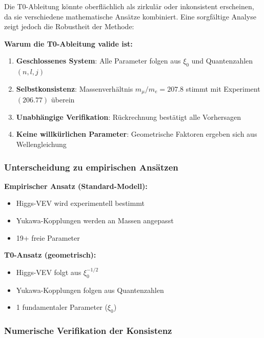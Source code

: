 \documentclass[12pt,a4paper]{article}
\begin{document}
Die T0-Ableitung könnte oberflächlich als zirkulär oder inkonsistent erscheinen, da sie verschiedene mathematische Ansätze kombiniert. Eine sorgfältige Analyse zeigt jedoch die Robustheit der Methode:

\begin{tcolorbox}[colback=blue!5!white,colframe=blue!75!black,title=Methodische Konsistenz]
	\textbf{Warum die T0-Ableitung valide ist:}
	
	\begin{enumerate}
		\item \textbf{Geschlossenes System}: Alle Parameter folgen aus $\xi_0$ und Quantenzahlen $(n,l,j)$
		\item \textbf{Selbstkonsistenz}: Massenverhältnis $m_\mu/m_e = 207.8$ stimmt mit Experiment $(206.77)$ überein
		\item \textbf{Unabhängige Verifikation}: Rückrechnung bestätigt alle Vorhersagen
		\item \textbf{Keine willkürlichen Parameter}: Geometrische Faktoren ergeben sich aus Wellengleichung
	\end{enumerate}
\end{tcolorbox}

\subsubsection{Unterscheidung zu empirischen Ansätzen}

\textbf{Empirischer Ansatz (Standard-Modell):}
\begin{itemize}
	\item Higgs-VEV wird experimentell bestimmt
	\item Yukawa-Kopplungen werden an Massen angepasst
	\item 19+ freie Parameter
\end{itemize}

\textbf{T0-Ansatz (geometrisch):}
\begin{itemize}
	\item Higgs-VEV folgt aus $\xi_0^{-1/2}$
	\item Yukawa-Kopplungen folgen aus Quantenzahlen
	\item 1 fundamentaler Parameter ($\xi_0$)
\end{itemize}

\subsubsection{Numerische Verifikation der Konsistenz}
\end{document}
